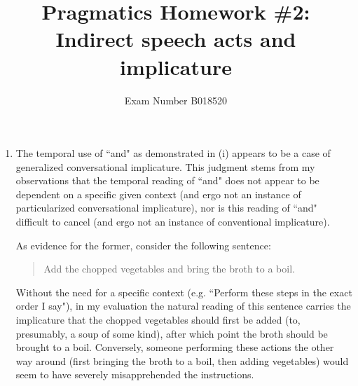 \documentclass[12pt,a4paper]{article}
\begin{document}
\title{Pragmatics Homework \#2: Indirect speech acts and implicature}
\author{Exam Number B018520}

\maketitle

\begin{enumerate}


\item The temporal use of ``and" as demonstrated in (i) appears to be a case of generalized conversational implicature. This judgment stems from my observations that the temporal reading of ``and" does not appear to be dependent on a specific given context (and ergo not an instance of particularized conversational implicature), nor is this reading of ``and" difficult to cancel (and ergo not an instance of conventional implicature). 

As evidence for the former, consider the following sentence:
\begin{quote}
Add the chopped vegetables and bring the broth to a boil.
\end{quote}
Without the need for a specific context (e.g. ``Perform these steps in the exact order I say"), in my evaluation the natural reading of this sentence carries the implicature that the chopped vegetables should first be added (to, presumably, a soup of some kind), after which point the broth should be brought to a boil. Conversely, someone performing these actions the other way around (first bringing the broth to a boil, then adding vegetables) would seem to have severely misapprehended the instructions. 


\end{enumerate}
\end{document}
